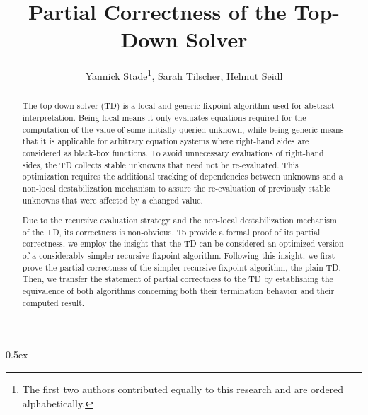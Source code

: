 \documentclass[11pt,a4paper]{article}
\newcommand{\td}{TD\xspace}
\begin{document}
\title{Partial Correctness of the Top-Down Solver}
\author{Yannick Stade\thanks{The first two authors contributed equally to this research and are ordered alphabetically.}, Sarah Tilscher\textsuperscript{\thefootnote}, Helmut Seidl}
\maketitle

\begin{abstract}
  The top-down solver (\td) is a local and generic fixpoint algorithm used for abstract interpretation.
  Being local means it only evaluates equations required for the computation of the value of some initially queried unknown, while being generic means that it is applicable for arbitrary equation systems where right-hand sides are considered as black-box functions.
  To avoid unnecessary evaluations of right-hand sides, the \td collects stable unknowns that need not be re-evaluated.
  This optimization requires the additional tracking of dependencies between unknowns and a non-local destabilization mechanism to assure the re-evaluation of previously stable unknowns that were affected by a changed value.

  Due to the recursive evaluation strategy and the non-local destabilization mechanism of the \td, its correctness is non-obvious.
  To provide a formal proof of its partial correctness, we employ the insight that the \td can be considered an optimized version of a considerably simpler recursive fixpoint algorithm.
  Following this insight, we first prove the partial correctness of the simpler recursive fixpoint algorithm, the plain \td.
  Then, we transfer the statement of partial correctness to the \td by establishing the equivalence of both algorithms concerning both their termination behavior and their computed result.
\end{abstract}

\newpage
\setcounter{tocdepth}{2}
\tableofcontents

\parindent 0pt\parskip 0.5ex

\newpage
\end{document}
